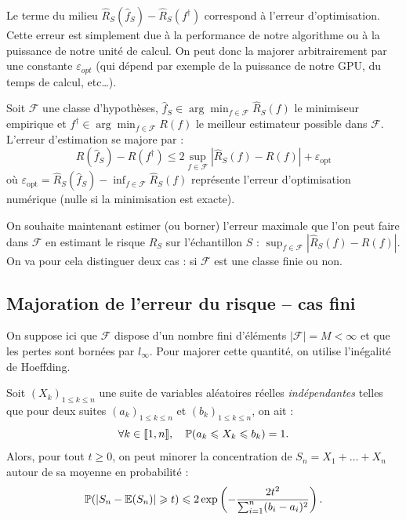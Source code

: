 Le terme du milieu $ \hat{R}_S( \hat{f}_S) - \hat{R}_S(f^\dagger)$ correspond à l'erreur d'optimisation. Cette erreur est simplement due à la performance de notre algorithme ou à la puissance de notre unité de calcul. On peut donc la majorer arbitrairement par une constante $ \varepsilon_{opt}$ (qui dépend par exemple de la puissance de notre GPU, du temps de calcul, etc\dots). 

\begin{proposition}
    Soit $\mathcal{F}$ une classe d'hypothèses, $\hat{f}_S \in \arg\min_{f \in \mathcal{F}} \hat{R}_S(f)$ le minimiseur empirique et $f^\dagger \in \arg\min_{f \in \mathcal{F}} R(f)$ le meilleur estimateur possible dans $ \mathcal{F}$. L'erreur d'estimation se majore par :
    \begin{equation}
        \boxed{R(\hat{f}_S) - R(f^\dagger) \leqslant 2 \sup_{f \in \mathcal{F}} |\hat{R}_S(f) - R(f)| + \varepsilon_{\mathrm{opt}}}
    \end{equation}
    où $\varepsilon_{\mathrm{opt}} = \hat{R}_S(\hat{f}_S) - \inf_{f \in \mathcal{F}} \hat{R}_S(f)$ représente l'erreur d'optimisation numérique (nulle si la minimisation est exacte).
\end{proposition}

On souhaite maintenant estimer (ou borner) l'erreur maximale que l'on peut faire dans $ \mathcal{F}$ en estimant le risque $ \hat{R}_S$ sur l'échantillon $S$ : $ \sup_{f \in \mathcal{F}} |\hat{R}_S(f) - R(f)|$. On va pour cela distinguer deux cas : si $ \mathcal{F}$ est une classe finie ou non. 

\subsection{Majoration de l'erreur du risque -- cas fini}
\label{sub-seq:cas-fini}

On suppose ici que $\mathcal{F}$ dispose d'un nombre fini d'éléments $|\mathcal{F}| = M < \infty$ et que les pertes sont bornées par $l_\infty$. Pour majorer cette quantité, on utilise l'inégalité de Hoeffding. 

\begin{theorem}
    Soit $(X_k)_{1 \leqslant k \leqslant n}$ une suite de variables aléatoires réelles \emph{indépendantes} telles que pour deux suites $(a_k)_{1 \leqslant k \leqslant n}$ et $ (b_k)_{1 \leqslant k \leqslant n}$, on ait : 
    \begin{equation}
        \forall k \in \llbracket 1, n \rrbracket, \quad \mathbb{P}(a_k \leqslant X_k \leqslant b_k) = 1. 
    \end{equation}
    Alors, pour tout $ t \geqslant 0$, on peut minorer la concentration de $S_n = X_1 + \dots + X_n$ autour de sa moyenne en probabilité : 
    \begin{equation}
        \mathbb{P}(|S_n - \mathbb{E}(S_n)| \geqslant t) \leqslant 2 \exp \left( - \frac{2 t^2}{ \sum_{i=1}^{n} (b_i - a_i)^2}\right). 
    \end{equation}
\end{theorem}

